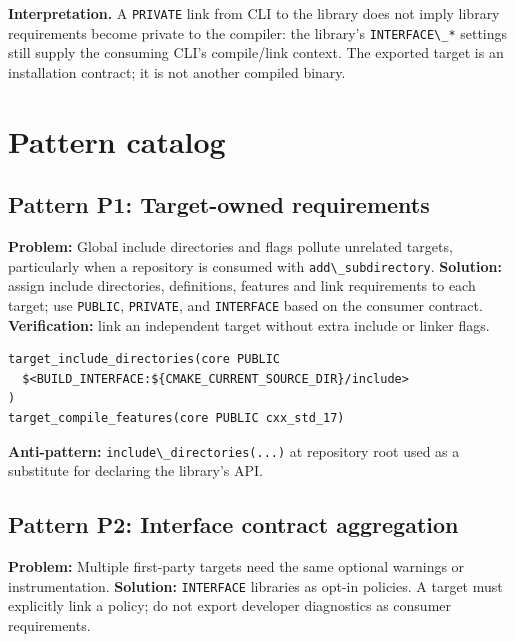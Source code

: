 \documentclass[11pt,letterpaper,oneside]{report}
\providecommand{\passthrough}[1]{#1}
\begin{document}
\textbf{Interpretation.} A \passthrough{\lstinline!PRIVATE!} link from
CLI to the library does not imply library requirements become private to
the compiler: the library's \passthrough{\lstinline!INTERFACE\_*!}
settings still supply the consuming CLI's compile/link context. The
exported target is an installation contract; it is not another compiled
binary.

\chapter{Pattern catalog}\label{pattern-catalog}

\section{Pattern P1: Target-owned
requirements}\label{pattern-p1-target-owned-requirements}

\textbf{Problem:} Global include directories and flags pollute unrelated
targets, particularly when a repository is consumed with
\passthrough{\lstinline!add\_subdirectory!}. \textbf{Solution:} assign
include directories, definitions, features and link requirements to each
target; use \passthrough{\lstinline!PUBLIC!},
\passthrough{\lstinline!PRIVATE!}, and
\passthrough{\lstinline!INTERFACE!} based on the consumer contract.
\textbf{Verification:} link an independent target without extra include
or linker flags.

\begin{lstlisting}
target_include_directories(core PUBLIC
  $<BUILD_INTERFACE:${CMAKE_CURRENT_SOURCE_DIR}/include>
)
target_compile_features(core PUBLIC cxx_std_17)
\end{lstlisting}

\textbf{Anti-pattern:}
\passthrough{\lstinline!include\_directories(...)!} at repository root
used as a substitute for declaring the library's API.

\section{Pattern P2: Interface contract
aggregation}\label{pattern-p2-interface-contract-aggregation}

\textbf{Problem:} Multiple first-party targets need the same optional
warnings or instrumentation. \textbf{Solution:}
\passthrough{\lstinline!INTERFACE!} libraries as opt-in policies. A
target must explicitly link a policy; do not export developer
diagnostics as consumer requirements.
\end{document}

